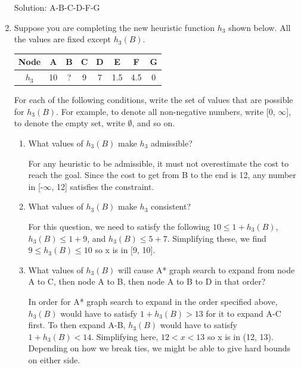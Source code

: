 \documentclass[11pt]{article}
\begin{document}
\begin{enumerate}
    Solution: A-B-C-D-F-G

  \item Suppose you are completing the new heuristic function $h_3$
    shown below.  All the values are fixed except $h_3(B)$.

\begin{center}
\begin{tabular}{|c|c|c|c|c|c|c|c|}
\hline
Node & A & B & C & D & E & F & G \\
\hline
$h_3$& 10 & ?  & 9 & 7 & 1.5 & 4.5& 0 \\
\hline
\end{tabular}
\end{center}

For each of the following conditions, write the set of values that are
possible for $h_3(B)$.  For example, to denote all non-negative
numbers, write [0, $\infty$], to denote the empty set, write
$\emptyset$, and so on.

\begin{enumerate}

\item What values of $h_3(B)$ make $h_3$ admissible?

For any heuristic to be admissible, it must not overestimate the cost to reach the goal. Since the cost to get from B to the end is 12, any number in [-$\infty$, 12] satisfies the constraint.

\item What values of $h_3(B)$ make $h_3$ consistent?

For this question, we need to satisfy the following $10 \leq 1 + h_3(B)$, $h_3(B) \leq 1 + 9$, and $h_3(B) \leq 5 + 7$. Simplifying these, we find $9 \leq h_3(B) \leq 10$ so x is in [9, 10].

\item What values of $h_3(B)$ will cause A* graph search to expand
  from node A to C, then node A to B, then node A to B to D in that
  order?

In order for A* graph search to expand in the order specified above, $h_3(B)$ would have to satisfy $1 + h_3(B) > 13$ for it to expand A-C first. To then expand A-B, $h_3(B)$ would have to satisfy $1 + h_3(B) < 14$. Simplifying here, $12 < x < 13$ so x is in (12, 13). Depending on how we break ties, we might be able to give hard bounds on either side.

\end{enumerate}

\end{enumerate}
\end{document}
